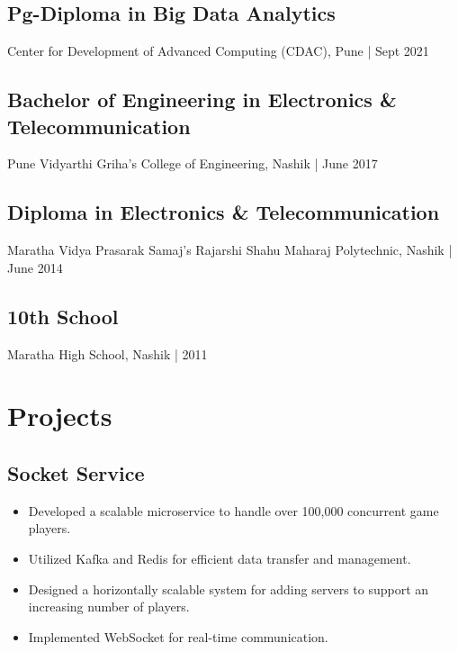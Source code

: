 \documentclass{article}%
\begin{document}
\subsection*{Pg{-}Diploma in Big Data Analytics}%
\label{subsec:Pg{-}DiplomainBigDataAnalytics}%
Center for Development of Advanced Computing (CDAC), Pune | Sept 2021

%
\subsection*{Bachelor of Engineering in Electronics \& Telecommunication}%
\label{subsec:BachelorofEngineeringinElectronicsTelecommunication}%
Pune Vidyarthi Griha's College of Engineering, Nashik | June 2017

%
\subsection*{Diploma in Electronics \& Telecommunication}%
\label{subsec:DiplomainElectronicsTelecommunication}%
Maratha Vidya Prasarak Samaj's Rajarshi Shahu Maharaj Polytechnic, Nashik | June 2014

%
\subsection*{10th School}%
\label{subsec:10thSchool}%
Maratha High School, Nashik | 2011

%
\section*{Projects}%
\label{sec:Projects}%
\subsection*{Socket Service}%
\label{subsec:SocketService}%
\begin{itemize}%
\item%
Developed a scalable microservice to handle over 100,000 concurrent game players.%
\item%
Utilized Kafka and Redis for efficient data transfer and management.%
\item%
Designed a horizontally scalable system for adding servers to support an increasing number of players.%
\item%
Implemented WebSocket for real{-}time communication.%
\end{itemize}

%
\end{document}
